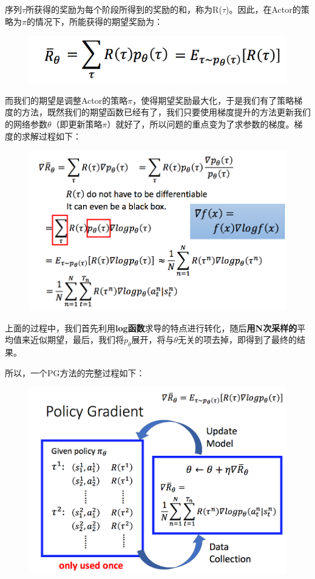 \documentclass[UTF8,a4paper,12pt]{ctexbook}
\begin{document}
		序列$\tau$所获得的奖励为每个阶段所得到的奖励的和，称为R($\tau$)。因此，在Actor的策略为$\pi$的情况下，所能获得的期望奖励为：
		\begin{figure}[H]
		\centering
		\includegraphics[width=.6\linewidth]{PG03}
		\end{figure}		
		
		而我们的期望是调整Actor的策略$\pi$，使得期望奖励最大化，于是我们有了策略梯度的方法，既然我们的期望函数已经有了，我们只要使用梯度提升的方法更新我们的网络参数$\theta$（即更新策略$\pi$）就好了，所以问题的重点变为了求参数的梯度。梯度的求解过程如下：
		\begin{figure}[H]
		\centering
		\includegraphics[width=.9\linewidth]{PG04}
		\end{figure}		
		
		上面的过程中，我们首先利用\textbf{log函数}求导的特点进行转化，随后\textbf{用N次采样的}平均值来近似期望，最后，我们将$p_\theta$展开，将与$\theta$无关的项去掉，即得到了最终的结果。
		
		所以，一个PG方法的完整过程如下：
		\begin{figure}[H]
		\centering
		\includegraphics[width=.9\linewidth]{PG05}
		\end{figure}			
		
\end{document}
